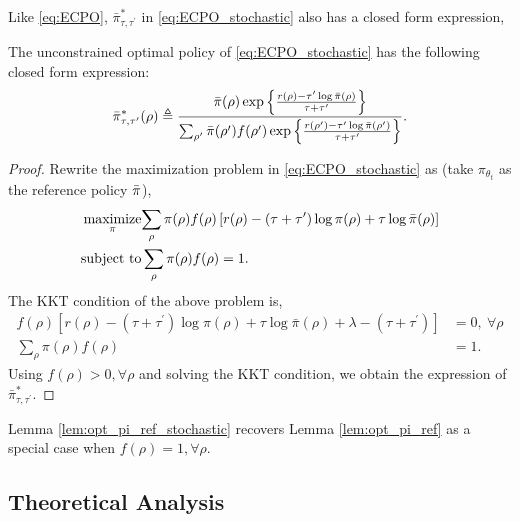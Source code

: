 Like \cref{eq:ECPO}, $\bar{\pi}_{\tau,\tau^{\prime}}^*$ in \cref{eq:ECPO_stochastic} also has a closed form expression,
\begin{lem}
\label{lem:opt_pi_ref_stochastic}
The unconstrained optimal policy of \cref{eq:ECPO_stochastic} has the following closed form expression:
\begin{equation*}
	\bar{\pi}_{\tau,\tau^{\prime}}^*(\rho) \triangleq \frac{\bar{\pi}(\rho) \exp\left\{ \frac{r(\rho)-\tau^{\prime} \log \bar{\pi}(\rho) }{ \tau+\tau^{\prime}} \right\}}{ \sum_{\rho^{\prime}}{\bar{\pi}(\rho^{\prime}) f(\rho^{\prime}) \exp\left\{ \frac{r(\rho^{\prime})-\tau^{\prime} \log \bar{\pi}(\rho^{\prime})}{ \tau+\tau^{\prime}} \right\} } }.
\end{equation*}
\end{lem}
\begin{proof}
Rewrite the maximization problem in \cref{eq:ECPO_stochastic} as (take $\pi_{\theta_t}$ as the reference policy $\bar{\pi}$),
\begin{equation*}
\begin{split}
	\operatorname*{\text{maximize}}\limits_{\pi}&{ \sum\limits_{\rho}{ \pi(\rho) f(\rho) \left[ r(\rho)  - \left( \tau + \tau^{\prime} \right) \log{\pi(\rho)} + \tau \log{\bar{\pi}(\rho)} \right]} } \\
	\text{subject to} &\sum\limits_{\rho}{ \pi(\rho) f(\rho)} = 1.
\end{split}
\end{equation*}
The KKT condition of the above problem is,
\begin{equation*}
\begin{split}
	f(\rho) \left[ r(\rho) - \left( \tau + \tau^{\prime} \right) \log{\pi(\rho)} + \tau \log{\bar{\pi}(\rho)} +  \lambda - \left( \tau + \tau^{\prime} \right) \right] &= 0, \ \forall \rho \\
	\sum\limits_{\rho}{ \pi(\rho) f(\rho)} &= 1.
\end{split}
\end{equation*}
Using $f(\rho) > 0, \forall \rho$ and solving the KKT condition, we obtain the expression of $\bar{\pi}_{\tau,\tau^{\prime}}^*$.
\end{proof}

Lemma \ref{lem:opt_pi_ref_stochastic} recovers Lemma \ref{lem:opt_pi_ref} as a special case when $f(\rho) = 1, \forall \rho$.

\subsection{Theoretical Analysis}

